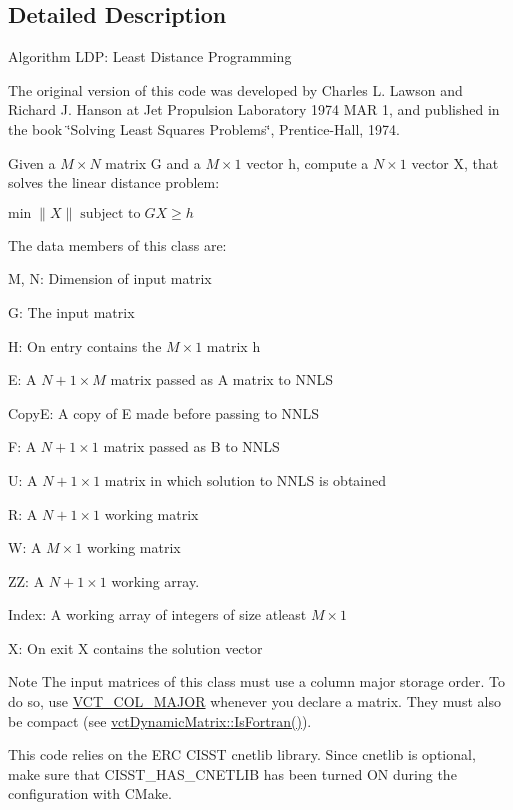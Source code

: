 \subsection{Detailed Description}
Algorithm L\-D\-P\-: Least Distance Programming

The original version of this code was developed by Charles L. Lawson and Richard J. Hanson at Jet Propulsion Laboratory 1974 M\-A\-R 1, and published in the book \char`\"{}\-Solving Least Squares Problems\char`\"{}, Prentice-\/\-Hall, 1974.

Given a $ M \times N $ matrix G and a $ M \times 1 $ vector h, compute a $ N \times 1 $ vector X, that solves the linear distance problem\-:

$ \mbox{min} \; \| X \| \; \mbox{subject to} \; GX \geq h $

The data members of this class are\-:
\begin{DoxyItemize}
\item M, N\-: Dimension of input matrix
\item G\-: The input matrix
\item H\-: On entry contains the $ M \times 1 $ matrix h
\item E\-: A $ N+1 \times M $ matrix passed as A matrix to N\-N\-L\-S
\item Copy\-E\-: A copy of E made before passing to N\-N\-L\-S
\item F\-: A $ N+1 \times 1 $ matrix passed as B to N\-N\-L\-S
\item U\-: A $ N+1 \times 1 $ matrix in which solution to N\-N\-L\-S is obtained
\item R\-: A $ N+1 \times 1 $ working matrix
\item W\-: A $ M \times 1 $ working matrix
\item Z\-Z\-: A $ N+1 \times 1 $ working array.
\item Index\-: A working array of integers of size atleast $ M \times 1 $
\item X\-: On exit X contains the solution vector
\end{DoxyItemize}

\begin{DoxyNote}{Note}
The input matrices of this class must use a column major storage order. To do so, use \hyperlink{vct_forward_declarations_8h_a432cdf8923afaf82f551450ad4034746}{V\-C\-T\-\_\-\-C\-O\-L\-\_\-\-M\-A\-J\-O\-R} whenever you declare a matrix. They must also be compact (see \hyperlink{classvct_dynamic_const_matrix_base_aac5f19015b4888f760f99daa4bac199c}{vct\-Dynamic\-Matrix\-::\-Is\-Fortran()}).

This code relies on the E\-R\-C C\-I\-S\-S\-T cnetlib library. Since cnetlib is optional, make sure that C\-I\-S\-S\-T\-\_\-\-H\-A\-S\-\_\-\-C\-N\-E\-T\-L\-I\-B has been turned O\-N during the configuration with C\-Make. 
\end{DoxyNote}


